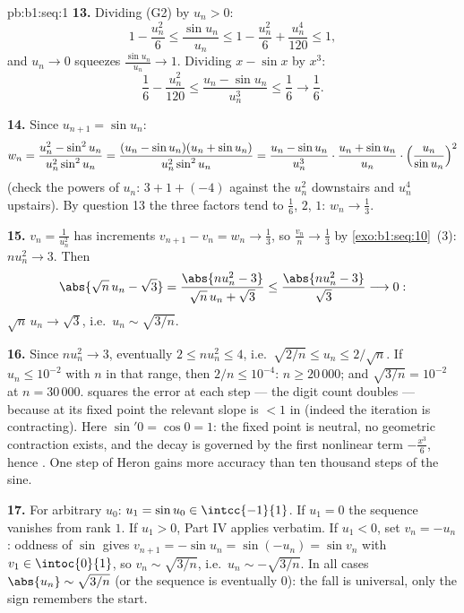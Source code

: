 \begin{solution}{pb:b1:seq:1}
\textbf{13.} Dividing (G2) by $u_n > 0$:
\[
1 - \frac{u_n^2}{6} \leq \frac{\sin u_n}{u_n} \leq 1 -
\frac{u_n^2}{6} + \frac{u_n^4}{120} \leq 1 ,
\]
and $u_n \to 0$ squeezes $\frac{\sin u_n}{u_n} \to 1$. Dividing
$x - \sin x$ by $x^3$:
\[
\frac16 - \frac{u_n^2}{120} \leq \frac{u_n - \sin u_n}{u_n^3}
\leq \frac16 \longrightarrow \frac16 .
\]

\textbf{14.} Since $u_{n+1} = \sin u_n$:
\[
w_n = \frac{u_n^2 - \sin^2 u_n}{u_n^2 \sin^2 u_n}
= \frac{(u_n - \sin u_n)(u_n + \sin u_n)}{u_n^2 \sin^2 u_n}
= \frac{u_n - \sin u_n}{u_n^3}\cdot
\frac{u_n + \sin u_n}{u_n}\cdot
\Bigl(\frac{u_n}{\sin u_n}\Bigr)^{2}
\]
(check the powers of $u_n$: $3 + 1 + (-4)$ against the $u_n^2$
downstairs and $u_n^4$ upstairs). By question 13 the three
factors tend to $\frac16$, $2$, $1$: $w_n \to \frac13$.

\textbf{15.} $v_n = \frac{1}{u_n^2}$ has increments $v_{n+1} -
v_n = w_n \to \frac13$, so $\frac{v_n}{n} \to \frac13$ by
\cref{exo:b1:seq:10}~(3): $n u_n^2 \to 3$. Then
\[
\abs{\sqrt n\,u_n - \sqrt 3}
= \frac{\abs{n u_n^2 - 3}}{\sqrt n\,u_n + \sqrt 3}
\leq \frac{\abs{n u_n^2 - 3}}{\sqrt 3} \longrightarrow 0 :
\]
$\sqrt n\,u_n \to \sqrt 3$, i.e.\ $u_n \sim \sqrt{3/n}$.

\textbf{16.} Since $n u_n^2 \to 3$, eventually $2 \leq n u_n^2
\leq 4$, i.e.\ $\sqrt{2/n} \leq u_n \leq 2/\sqrt n$. If $u_n
\leq 10^{-2}$ with $n$ in that range, then $2/n \leq 10^{-4}$:
$n \geq 20\,000$; and $\sqrt{3/n} = 10^{-2}$ at $n = 30\,000$.
 squares the error at each step --- the digit
count doubles --- because at its fixed point the relevant slope
is $< 1$ in  (indeed the iteration is contracting).
Here $\sin' 0 = \cos 0 = 1$: the fixed point is neutral, no
geometric contraction exists, and the decay is governed by the
first nonlinear term $-\frac{x^3}{6}$, hence . One
step of Heron gains more accuracy than ten thousand steps of
the sine.

\textbf{17.} For arbitrary $u_0$: $u_1 = \sin u_0 \in
\intcc{-1}{1}$. If $u_1 = 0$ the sequence vanishes from rank
$1$. If $u_1 > 0$, Part IV applies verbatim. If $u_1 < 0$, set
$v_n = -u_n$: oddness of $\sin$ gives $v_{n+1} = -\sin u_n =
\sin(-u_n) = \sin v_n$ with $v_1 \in \intoc{0}{1}$, so $v_n \sim
\sqrt{3/n}$, i.e.\ $u_n \sim -\sqrt{3/n}$. In all cases
$\abs{u_n} \sim \sqrt{3/n}$ (or the sequence is eventually $0$):
the fall is universal, only the sign remembers the start.


\end{solution}
